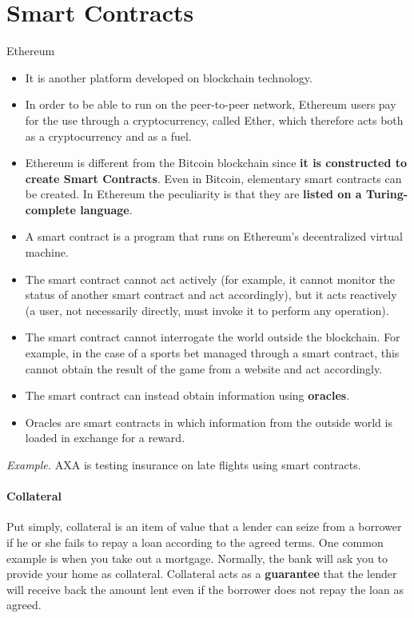 \section{Smart Contracts}

Ethereum
\begin{itemize}
	\item It is another platform developed on blockchain technology.
	\item In order to be able to run on the peer-to-peer network, Ethereum users pay for the use through a cryptocurrency, called Ether, which therefore acts both as a cryptocurrency and as a fuel.
	\item Ethereum is different from the Bitcoin blockchain since \textbf{it is constructed to create Smart Contracts}. Even in Bitcoin, elementary smart contracts can be created. In Ethereum the peculiarity is that they are \textbf{listed on a Turing-complete language}.
	\item A smart contract is a program that runs on Ethereum's decentralized virtual machine.
	\item The smart contract cannot act actively (for example, it cannot monitor the status of another smart contract and act accordingly), but it acts reactively (a user, not necessarily directly, must invoke it to perform any operation).
	\item The smart contract cannot interrogate the world outside the blockchain. For example, in the case of a sports bet managed through a smart contract, this cannot obtain the result of the game from a website and act accordingly.
	\item The smart contract can instead obtain information using \textbf{oracles}.
	\item Oracles are smart contracts in which information from the outside world is loaded in exchange for a reward.
\end{itemize}

\emph{Example.} AXA is testing insurance on late flights using smart contracts.

\paragraph{Collateral} Put simply, collateral is an item of value that a lender can seize from a borrower if he or she fails to repay a loan according to the agreed terms. One common example is when you take out a mortgage. Normally, the bank will ask you to provide your home as collateral.
Collateral acts as a \textbf{guarantee} that the lender will receive back the amount lent even if the borrower does not repay the loan as agreed.

